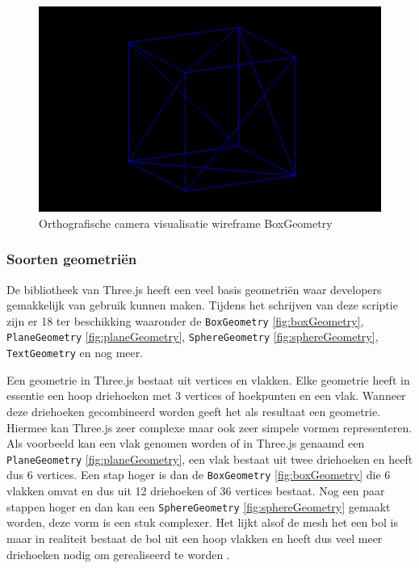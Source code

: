 \begin{figure}
	\centering
	\includegraphics[width=1\linewidth]{graphics/orthografischeCamera}
	\caption[Orthografische camera visualisatie]{Orthografische camera visualisatie wireframe BoxGeometry}
	\label{fig:orthografischeCamera}
\end{figure}
\newpage
\subsubsection{Soorten geometriën}

De bibliotheek van Three.js heeft een veel basis geometriën waar developers gemakkelijk van gebruik kunnen maken. Tijdens het schrijven van deze scriptie zijn er 18 ter beschikking waaronder de \texttt{BoxGeometry} \ref{fig:boxGeometry}, \texttt{PlaneGeometry} \ref{fig:planeGeometry}, \texttt{SphereGeometry} \ref{fig:sphereGeometry}, \texttt{TextGeometry} en nog meer.

Een geometrie in Three.js bestaat uit vertices en vlakken. Elke geometrie heeft in essentie een hoop driehoeken met 3 vertices of hoekpunten en een vlak. Wanneer deze driehoeken gecombineerd worden geeft het als resultaat een geometrie. Hiermee kan Three.js zeer complexe maar ook zeer simpele vormen representeren. Als voorbeeld kan een vlak genomen worden of in Three.js genaamd een \texttt{PlaneGeometry} \ref{fig:planeGeometry}, een vlak bestaat uit twee driehoeken en heeft dus 6 vertices. Een stap hoger is dan de \texttt{BoxGeometry} \ref{fig:boxGeometry} die 6 vlakken omvat en dus uit 12 driehoeken of 36 vertices bestaat. Nog een paar stappen hoger en dan kan een \texttt{SphereGeometry} \ref{fig:sphereGeometry} gemaakt worden, deze vorm is een stuk complexer. Het lijkt alsof de mesh het een bol is maar in realiteit bestaat de bol uit een hoop vlakken en heeft dus veel meer driehoeken nodig om gerealiseerd te worden \autocite{threejs2023}.

